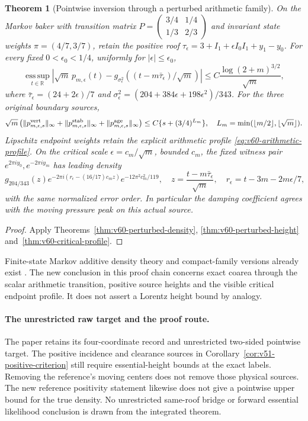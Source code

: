 \documentclass[11pt,reqno]{amsart}
\numberwithin{equation}{section}
\newtheorem{leadtheorem}{Theorem}
\theoremstyle{definition}\newtheorem{definition}[theorem]{Definition}
\theoremstyle{remark}\newtheorem{remark}[theorem]{Remark}
\newcommand{\R}{\mathbb R}\newcommand{\Z}{\mathbb Z}\newcommand{\T}{\mathbb T}
\begin{document}
\begin{leadtheorem}[Pointwise inversion through a perturbed arithmetic family]
\label{thm:intro-v60-perturbed}
On the Markov baker with transition matrix
$P=\left(\begin{smallmatrix}3/4&1/4\\1/3&2/3\end{smallmatrix}\right)$
and invariant state weights $\pi=(4/7,3/7)$, retain the positive roof
$\tau_\epsilon=3+I_1+\epsilon I_0I_1+y_1-y_0$.
For every fixed $0<\epsilon_0<1/4$, uniformly for
$|\epsilon|\le\epsilon_0$,
\[
 \operatorname*{ess\,sup}_{t\in\R}
 \left|\sqrt m\,p_{m,\epsilon}(t)
 -g_{\sigma_\epsilon^2}((t-m\bar\tau_\epsilon)/\sqrt m)\right|
 \le C\frac{\log(2+m)^{3/2}}{\sqrt m},
\]
where $\bar\tau_\epsilon=(24+2\epsilon)/7$ and
$\sigma_\epsilon^2=(204+384\epsilon+198\epsilon^2)/343$.
For the three original boundary sources,
\[
 \sqrt m\left(\|p_{m,\epsilon,s}^{\rm vert}\|_\infty
 +\|p_{m,\epsilon,s}^{\rm stab}\|_\infty
 +\|p_{m,\epsilon,s}^{\rm age}\|_\infty\right)
 \le C\{s+(3/4)^{L_m}\},\quad
 L_m=\min(\lfloor m/2\rfloor,\lfloor\sqrt m\rfloor).
\]
Lipschitz endpoint weights retain the explicit arithmetic profile
\eqref{eq:v60-arithmetic-profile}. On the critical scale
$\epsilon=c_m/\sqrt m$, bounded $c_m$, the fixed witness pair
$e^{2\pi iy_0},e^{-2\pi iy_m}$ has leading density
\[
 g_{204/343}(z)
 e^{-2\pi i(r_\epsilon-(16/17)c_mz)}e^{-12\pi^2c_m^2/119},
 \quad z=\frac{t-m\bar\tau_\epsilon}{\sqrt m},\quad
 r_\epsilon=t-3m-2m\epsilon/7,
\]
with the same normalized error order. In particular the damping
coefficient agrees with the moving pressure peak on this actual source.
\end{leadtheorem}
\begin{proof}
Apply Theorems~\ref{thm:v60-perturbed-density},
\ref{thm:v60-perturbed-height} and~\ref{thm:v60-critical-profile}.
\end{proof}

Finite-state Markov additive density theory and compact-family versions
already exist \cite{HL,HLuniform}. The new conclusion in this proof
chain concerns exact coarea through the scalar arithmetic transition,
positive source heights and the visible critical endpoint profile.
It does not assert a Lorentz height bound by analogy.

\paragraph{The unrestricted raw target and the proof route.}
The paper retains its four-coordinate record and unrestricted
two-sided pointwise target. The positive incidence and clearance
sources in Corollary~\ref{cor:v51-positive-criterion} still require
essential-height bounds at the exact labels. Removing the reference's
moving centers does not remove those physical sources. The new
reference positivity statement likewise does not give a pointwise
upper bound for the true density. No unrestricted same-roof bridge
or forward essential likelihood conclusion is drawn from the
integrated theorem.
\end{document}
